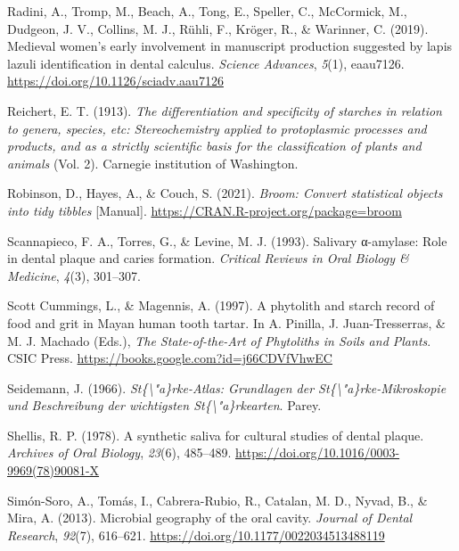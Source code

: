 \documentclass[
  letterpaper,
]{book}
\newlength{\cslhangindent}
\newlength{\cslentryspacingunit} %
\newenvironment{CSLReferences}[2] %
 {%
  \setlength{\parindent}{0pt}
  \ifodd #1
  \let\oldpar\par
  \def\par{\hangindent=\cslhangindent\oldpar}
  \fi
  \setlength{\parskip}{#2\cslentryspacingunit}
 }%
 {}
\begin{document}
\begin{CSLReferences}{1}{0}
\leavevmode{}%
Radini, A., Tromp, M., Beach, A., Tong, E., Speller, C., McCormick, M.,
Dudgeon, J. V., Collins, M. J., Rühli, F., Kröger, R., \& Warinner, C.
(2019). Medieval women's early involvement in manuscript production
suggested by lapis lazuli identification in dental calculus.
\emph{Science Advances}, \emph{5}(1), eaau7126.
\url{https://doi.org/10.1126/sciadv.aau7126}

\leavevmode{}%
Reichert, E. T. (1913). \emph{The differentiation and specificity of
starches in relation to genera, species, etc: Stereochemistry applied to
protoplasmic processes and products, and as a strictly scientific basis
for the classification of plants and animals} (Vol. 2). {Carnegie
institution of Washington}.

\leavevmode{}%
Robinson, D., Hayes, A., \& Couch, S. (2021). \emph{Broom: {Convert}
statistical objects into tidy tibbles} {[}Manual{]}.
\url{https://CRAN.R-project.org/package=broom}

\leavevmode{}%
Scannapieco, F. A., Torres, G., \& Levine, M. J. (1993). Salivary
α-amylase: Role in dental plaque and caries formation. \emph{Critical
Reviews in Oral Biology \& Medicine}, \emph{4}(3), 301--307.

\leavevmode{}%
Scott Cummings, L., \& Magennis, A. (1997). A phytolith and starch
record of food and grit in {Mayan} human tooth tartar. In A. Pinilla, J.
Juan-Tresserras, \& M. J. Machado (Eds.), \emph{The {State-of-the-Art}
of {Phytoliths} in {Soils} and {Plants}}. {CSIC Press}.
\url{https://books.google.com?id=j66CDVfVhwEC}

\leavevmode{}%
Seidemann, J. (1966). \emph{St\{\textbackslash"a\}rke-{Atlas}:
{Grundlagen} der {St}\{\textbackslash"a\}rke-{Mikroskopie} und
{Beschreibung} der wichtigsten {St}\{\textbackslash"a\}rkearten}.
{Parey}.

\leavevmode{}%
Shellis, R. P. (1978). A synthetic saliva for cultural studies of dental
plaque. \emph{Archives of Oral Biology}, \emph{23}(6), 485--489.
\url{https://doi.org/10.1016/0003-9969(78)90081-X}

\leavevmode{}%
Simón-Soro, A., Tomás, I., Cabrera-Rubio, R., Catalan, M. D., Nyvad, B.,
\& Mira, A. (2013). Microbial geography of the oral cavity.
\emph{Journal of Dental Research}, \emph{92}(7), 616--621.
\url{https://doi.org/10.1177/0022034513488119}


\end{CSLReferences}
\end{document}
